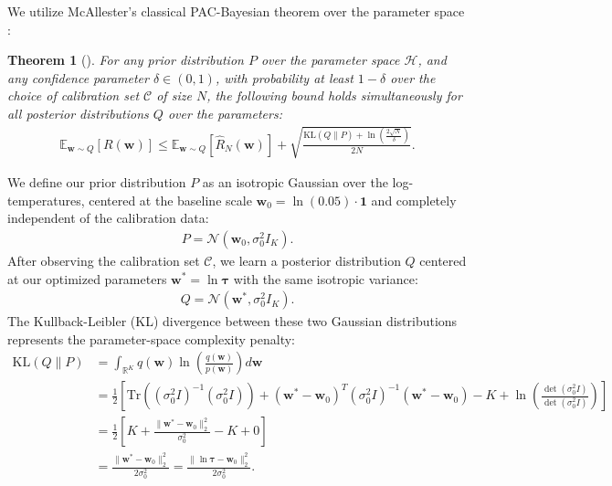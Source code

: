 \documentclass{article}
\theoremstyle{plain}
\newtheorem{theorem}{Theorem}[section]
\theoremstyle{definition}
\theoremstyle{remark}
\begin{document}
We utilize McAllester's classical PAC-Bayesian theorem over the parameter space \cite{mcallester1999pac}:
\begin{theorem}[\cite{mcallester1999pac}]
For any prior distribution $P$ over the parameter space $\mathcal{H}$, and any confidence parameter $\delta \in (0, 1)$, with probability at least $1 - \delta$ over the choice of calibration set $\mathcal{C}$ of size $N$, the following bound holds simultaneously for all posterior distributions $Q$ over the parameters:
\begin{align}
    \mathbb{E}_{\mathbf{w} \sim Q} \left[ R(\mathbf{w}) \right] \le \mathbb{E}_{\mathbf{w} \sim Q} \left[ \hat{R}_N(\mathbf{w}) \right] + \sqrt{\frac{\text{KL}(Q \| P) + \ln\left(\frac{2\sqrt{N}}{\delta}\right)}{2N}}.
\end{align}
\label{thm:mcallester_param}
\end{theorem}

We define our prior distribution $P$ as an isotropic Gaussian over the log-temperatures, centered at the baseline scale $\mathbf{w}_0 = \ln(0.05) \cdot \mathbf{1}$ and completely independent of the calibration data:
\begin{align}
    P = \mathcal{N}(\mathbf{w}_0, \sigma_0^2 I_K).
\end{align}
After observing the calibration set $\mathcal{C}$, we learn a posterior distribution $Q$ centered at our optimized parameters $\mathbf{w}^* = \ln \boldsymbol{\tau}$ with the same isotropic variance:
\begin{align}
    Q = \mathcal{N}(\mathbf{w}^*, \sigma_0^2 I_K).
\end{align}
The Kullback-Leibler (KL) divergence between these two Gaussian distributions represents the parameter-space complexity penalty:
\begin{align}
    \text{KL}(Q \| P) &= \int_{\mathbb{R}^K} q(\mathbf{w}) \ln \left( \frac{q(\mathbf{w})}{p(\mathbf{w})} \right) d\mathbf{w} \\
    &= \frac{1}{2} \left[ \text{Tr}\left( (\sigma_0^2 I)^{-1} (\sigma_0^2 I) \right) + (\mathbf{w}^* - \mathbf{w}_0)^T (\sigma_0^2 I)^{-1} (\mathbf{w}^* - \mathbf{w}_0) - K + \ln \left( \frac{\det(\sigma_0^2 I)}{\det(\sigma_0^2 I)} \right) \right] \\
    &= \frac{1}{2} \left[ K + \frac{\|\mathbf{w}^* - \mathbf{w}_0\|_2^2}{\sigma_0^2} - K + 0 \right] \\
    &= \frac{\|\mathbf{w}^* - \mathbf{w}_0\|_2^2}{2 \sigma_0^2} = \frac{\|\ln \boldsymbol{\tau} - \mathbf{w}_0\|_2^2}{2 \sigma_0^2}.
\end{align}
\end{document}
